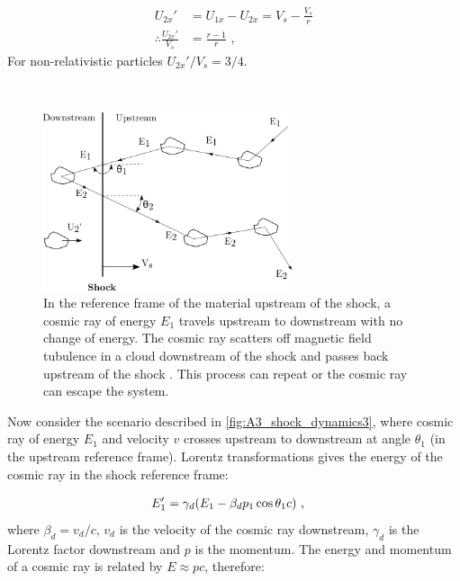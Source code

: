 \begin{equation}
    \begin{aligned}
        U_{2x}'&=U_{1x}-U_{2x} =V_s- \frac{V_s}{r} \\
        \therefore \frac{U_{2x}'}{V_s}&=\frac{r-1}{r}\text{ ,}
    \end{aligned} \label{eq:down_upstream_v_ratio}
\end{equation}
\noindent For non-relativistic particles ${U_{2x}'}/{V_s}=3/4$.
\par~\par 
\begin{figure}
	\centering
	\includegraphics[width=0.65\textwidth]{A3_Diffusive_Shock_Acceleration/Images/dsa.png}
	\caption{In the reference frame of the material upstream of the shock, a cosmic ray of energy $E_1$ travels upstream to downstream with no change of energy. The cosmic ray scatters off magnetic field tubulence in a  cloud downstream of the shock and passes back upstream of the shock . This process can repeat or the cosmic ray can escape the system.}
	\label{fig:A3_shock_dynamics3}
\end{figure}

Now consider the scenario described in \autoref{fig:A3_shock_dynamics3}, where cosmic ray of energy $E_1$ and velocity $v$ crosses upstream to downstream at angle $\theta_1$ (in the upstream reference frame). Lorentz transformations gives the energy of the cosmic ray in the shock reference frame:

\begin{equation}
    \begin{aligned}
        E_1'&=\gamma_d\qty(E_1-\beta_d p_1\cos\theta_1 c)\text{ ,}
    \end{aligned}
\end{equation}
\noindent where $\beta_d=v_d/c$, $v_d$ is the velocity of the cosmic ray downstream, $\gamma_d$ is the Lorentz factor downstream and $p$ is the momentum. The energy and momentum of a cosmic ray is related by $E\approx pc$, therefore:

